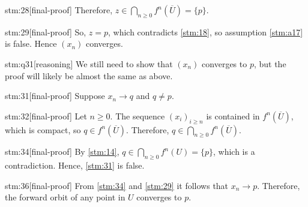 \begin{stm}{stm:28}[final-proof]
Therefore, $z \in \bigcap_{n \ge 0} f^n(\overline{U}) = \{p\}$.
\end{stm}

\begin{stm}{stm:29}[final-proof]
So, $z = p$, which contradicts \ref{stm:18}, so assumption \ref{stm:a17} is false. Hence $(x_n)$ converges.
\end{stm}

\begin{stm}{stm:q31}[reasoning]
We still need to show that $(x_n)$ converges to $p$, but the proof will likely be almost the same as above.
\end{stm}

\begin{stm}{stm:31}[final-proof]
Suppose $x_n \to q$ and $q \ne p$.
\end{stm}

\begin{stm}{stm:32}[final-proof]
Let $n \ge 0$. The sequence $(x_i)_{i \ge n}$ is contained in $f^n(\overline{U})$, which is compact, so $q \in f^n(\overline{U})$. Therefore, $q \in \bigcap_{n \ge 0} f^n(\overline{U})$.
\end{stm}

\begin{stm}{stm:34}[final-proof]
By \ref{stm:14}, $q \in \bigcap_{n \ge 0} f^n(U) = \{p\}$, which is a contradiction. Hence, \ref{stm:31} is false.
\end{stm}

\begin{stm}{stm:36}[final-proof]
From \ref{stm:34} and \ref{stm:29} it follows that $x_n \to p$. Therefore, the forward orbit of any point in $U$ converges to $p$.
\end{stm}